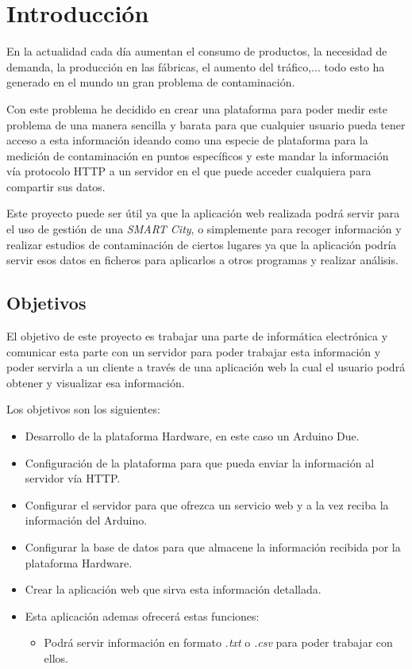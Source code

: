 
\chapter{Introducción}

	En la actualidad cada día aumentan el consumo de productos, la necesidad de demanda, la producción en las fábricas, el aumento del tráfico,... todo esto ha generado en el mundo un gran problema de contaminación.
	
	\setlength{\parindent}{0ex}Con este problema he decidido en crear una plataforma para poder medir este problema de una manera sencilla y barata para que cualquier usuario pueda tener acceso a esta información ideando como una especie de plataforma para la medición de contaminación en puntos específicos y este mandar la información vía protocolo HTTP a un servidor en el que puede acceder cualquiera para compartir sus datos.
	
	Este proyecto puede ser útil ya que la aplicación web realizada podrá servir para el uso de gestión de una \textit{SMART City}, o simplemente para recoger información y realizar estudios de contaminación de ciertos lugares ya que la aplicación podría servir esos datos en ficheros para aplicarlos a otros programas y realizar análisis.

\section{Objetivos}

\setlength{\parindent}{5ex}El objetivo de este proyecto es trabajar una parte de informática electrónica y comunicar esta parte con un servidor para poder trabajar esta información y poder servirla a un cliente a través de una aplicación web la cual el usuario podrá obtener y visualizar esa información.

\setlength{\parindent}{0ex}Los objetivos son los siguientes:

\begin{itemize}
\item Desarrollo de la plataforma Hardware, en este caso un Arduino Due.
\item Configuración de la plataforma para que pueda enviar la información al servidor vía HTTP.
\item Configurar el servidor para que ofrezca un servicio web y a la vez reciba la información del Arduino.
\item Configurar la base de datos para que almacene la información recibida por la plataforma Hardware.
\item Crear la aplicación web que sirva esta información detallada.
\item Esta aplicación ademas ofrecerá estas funciones:
	\begin{itemize}
	\item Podrá servir información en formato \textit{.txt} o \textit{.csv} para poder trabajar con ellos.
	
	\end{itemize}
\end{itemize}


